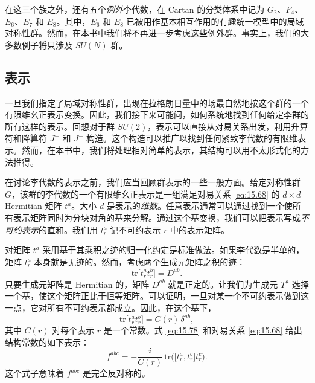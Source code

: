 在这三个族之外，还有五个\emph{例外}李代数，在 Cartan 的分类体系中记为 $G_2$、$F_4$、$E_6$、$E_7$ 和 $E_8$。其中，$E_6$ 和 $E_8$ 已被用作基本相互作用的有趣统一模型中的局域对称性群。然而，在本书中我们将不再进一步考虑这些例外群。事实上，我们的大多数例子将只涉及 $SU(N)$ 群。

\subsection{表示}

一旦我们指定了局域对称性群，出现在拉格朗日量中的场最自然地按这个群的一个有限维幺正表示变换。因此，我们接下来可能问，如何系统地找到任何给定李群的所有这样的表示。回想对于群 $SU(2)$，表示可以直接从对易关系出发，利用升算符和降算符 $J^+$ 和 $J^-$ 构造。这个构造可以推广以找到任何紧致李代数的有限维表示。然而，在本书中，我们将处理相对简单的表示，其结构可以用不太形式化的方法推得。

在讨论李代数的表示之前，我们应当回顾群表示的一些一般方面。给定对称性群 $G$，该群的李代数的一个有限维幺正表示是一组满足对易关系 \eqref{eq:15.68} 的 $d\times d$ Hermitian 矩阵 $t^a$。大小 $d$ 是表示的\emph{维数}。任意表示通常可以通过找到一个使所有表示矩阵同时为分块对角的基来分解。通过这个基变换，我们可以把表示写成\emph{不可约表示}的直和。我们用 $t^a_r$ 记不可约表示 $r$ 中的表示矩阵。

对矩阵 $t^a$ 采用基于其乘积之迹的归一化约定是标准做法。如果李代数是半单的，矩阵 $t^a_r$ 本身就是无迹的。然而，考虑两个生成元矩阵之积的迹：
\begin{equation}
  \mathrm{tr}\bigl[ t^a_r t^b_r \bigr] = D^{ab} .
  \label{eq:15.77}
\end{equation}
只要生成元矩阵是 Hermitian 的，矩阵 $D^{ab}$ 就是正定的。让我们为生成元 $T^a$ 选择一个基，使这个矩阵正比于恒等矩阵。可以证明，一旦对某一个不可约表示做到这一点，它对所有不可约表示都成立。因此，在这个基下，
\begin{equation}
  \mathrm{tr}\bigl[ t^a_r t^b_r \bigr] = C(r)\,\delta^{ab} ,
  \label{eq:15.78}
\end{equation}
其中 $C(r)$ 对每个表示 $r$ 是一个常数。式
\eqref{eq:15.78} 和对易关系 \eqref{eq:15.68} 给出结构常数的如下表示：
\begin{equation}
  f^{abc} = -\frac{i}{C(r)}\,\mathrm{tr}\bigl( \bigl[ t^a_r, t^b_r \bigr]
    t^c_r \bigr) .
  \label{eq:15.79}
\end{equation}
这个式子意味着 $f^{abc}$ 是完全反对称的。

